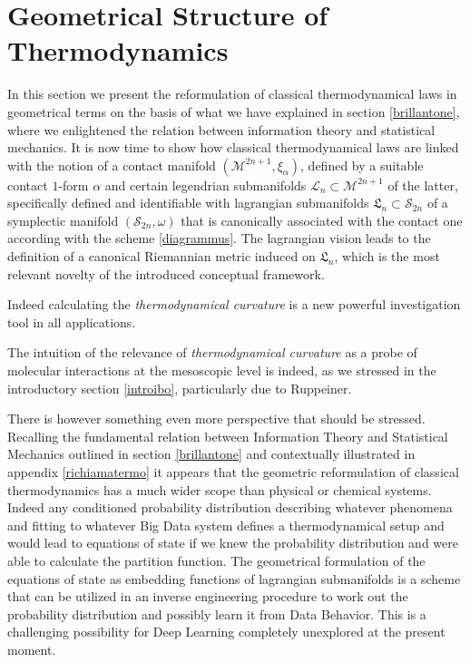 \documentclass[10pt,a4paper]{article}
\begin{document}
\section{Geometrical Structure of Thermodynamics} \label{geostructa}
In this section we present the reformulation of classical thermodynamical laws in geometrical terms on the basis of what  we have
explained in section \ref{brillantone}, where we enlightened the relation between information theory and
statistical mechanics.  It is now time to  show how classical thermodynamical laws are linked
with the notion of a contact manifold  $\left(\mathcal{M}^{2n+1},\xi_\alpha\right)$, defined by a suitable
contact $1$-form $\alpha$ and certain legendrian submanifolds $\mathcal{L}_n\subset
\mathcal{M}^{2n+1}$ of the latter, specifically defined and identifiable with lagrangian submanifolds
$\mathfrak{L}_n \subset \mathcal{S}_{2n}$  of a symplectic manifold $\left(
\mathcal{S}_{2n},\omega \right)$ that is canonically associated with the contact one
according with the scheme \ref{diagrammus}. The lagrangian vision leads to the definition of a canonical
Riemannian metric induced on $\mathfrak{L}_n$, which is the most relevant novelty of the introduced
conceptual framework.
\par
Indeed calculating the \textit{thermodynamical curvature}
is a new powerful investigation tool in all applications.
\par
The intuition of the relevance of \textit{thermodynamical curvature} as a probe
of molecular interactions at the mesoscopic level is indeed, as we stressed in the introductory
section \ref{introibo}, particularly due to Ruppeiner.
\par
There is however something even more perspective that should be stressed.
Recalling the fundamental relation between Information Theory and Statistical Mechanics outlined in section \ref{brillantone}
and contextually illustrated in appendix \ref{richiamatermo} it appears that the geometric reformulation of classical thermodynamics has a much wider scope than physical or chemical systems. Indeed any conditioned probability distribution describing whatever phenomena and fitting to whatever Big Data system defines a thermodynamical setup and would lead to equations of state if we knew the probability distribution and were able to calculate the partition function. The geometrical formulation of the equations of state
as embedding functions of lagrangian submanifolds is a scheme that can be utilized in an inverse engineering procedure to work out the probability distribution and possibly learn it from Data Behavior. This is a challenging possibility for Deep Learning completely  unexplored at the present moment.
\end{document}
